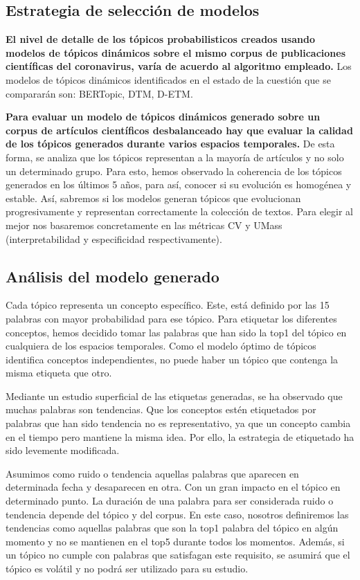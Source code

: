 \documentclass[a4paper,10pt]{article}
\begin{document}
\subsection{Estrategia de selección de modelos}

\textbf{El nivel de detalle de los tópicos probabilisticos creados usando modelos de tópicos dinámicos sobre el mismo corpus de publicaciones científicas del coronavirus, varía de acuerdo al algoritmo empleado.} Los modelos de tópicos dinámicos identificados en el estado de la cuestión que se compararán son: BERTopic, DTM, D-ETM.

\textbf{Para evaluar un modelo de tópicos dinámicos generado sobre un corpus de artículos científicos desbalanceado hay que evaluar la calidad de los tópicos generados durante varios espacios temporales.} De esta forma, se analiza que los tópicos representan a la mayoría de artículos y no solo un determinado grupo. Para esto, hemos observado la coherencia de los tópicos generados en los últimos 5 años, para así, conocer si su evolución es homogénea y estable. Así, sabremos si los modelos generan tópicos que evolucionan progresivamente y representan correctamente la colección de textos. Para elegir al mejor nos basaremos concretamente en las métricas CV y UMass (interpretabilidad y especificidad respectivamente).

\subsection{Análisis del modelo generado}

Cada tópico representa un concepto específico. Este, está definido por las 15 palabras con mayor probabilidad para ese tópico. Para etiquetar los diferentes conceptos, hemos decidido tomar las palabras que han sido la top1 del tópico en cualquiera de los espacios temporales. Como el modelo óptimo de tópicos identifica conceptos independientes, no puede haber un tópico que contenga la misma etiqueta que otro.

Mediante un estudio superficial de las etiquetas generadas, se ha observado que muchas palabras son tendencias. Que los conceptos estén etiquetados por palabras que han sido tendencia no es representativo, ya que un concepto cambia en el tiempo pero mantiene la misma idea. Por ello, la estrategia de etiquetado ha sido levemente modificada.

Asumimos como ruido o tendencia aquellas palabras que aparecen en determinada fecha y desaparecen en otra. Con un gran impacto en el tópico en determinado punto. La duración de una palabra para ser considerada ruido o tendencia depende del tópico y del corpus. En este caso, nosotros definiremos las tendencias como aquellas palabras que son la top1 palabra del tópico en algún momento y no se mantienen en el top5 durante todos los momentos. Además, si un tópico no cumple con palabras que satisfagan este requisito, se asumirá que el tópico es volátil y no podrá ser utilizado para su estudio.
\end{document}

